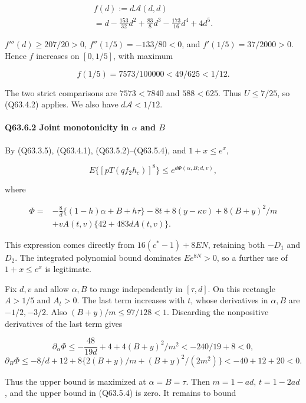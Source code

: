 \[
\begin{gathered}
f(d):=d\mathcal A(d,d)\\
=d-\frac{153}{32}d^2+\frac{83}{8}d^3-\frac{173}{16}d^4+4d^5.
\end{gathered}
\]

$f'''(d)\ge\allowbreak 207/20>\allowbreak 0$, $f''(1/5)=\allowbreak -133/80<\allowbreak 0$, and $f'(1/5)=\allowbreak 37/2000>\allowbreak 0$.
Hence $f$ increases on $[0,\allowbreak  1/5]$, with maximum

\[
f(1/5)=7573/100000<49/625<1/12.
\tag{Q63.6.2}\label{eq:Q63:Q63:6:2}
\]

The two strict comparisons are $7573<\allowbreak 7840$ and $588<\allowbreak 625$.
Thus $U\le\allowbreak 7/25$, so (Q63.4.2) applies. We also have $d\mathcal A<\allowbreak 1/12$.

\paragraph{Q63.6.2 Joint monotonicity in $\alpha$ and $B$}

By (Q63.3.5), (Q63.4.1), (Q63.5.2)--(Q63.5.4), and $1+x\le\allowbreak  e^x$,

\[
E\{[pT(qf_2h_c)]^8\}\le e^{d\Phi(\alpha,B;d,v)},
\]

where

\[
\begin{aligned}
\Phi={}&-\frac8d\{(1-h)\alpha+B+h\tau\}-8t
+8(y-\kappa v)+8(B+y)^2/m\\
&+v A(t,v)\{42+483dA(t,v)\}.
\end{aligned}
\tag{Q63.6.3}\label{eq:Q63:Q63:6:3}
\]

This expression comes directly from $16(c^*-1)+8EN$, retaining both $-D_1$ and $D_2$.
The integrated polynomial bound dominates $Ee^{8N}>\allowbreak 0$, so a further use of $1+x\le\allowbreak  e^x$ is legitimate.

Fix $d,\allowbreak  v$ and allow $\alpha,\allowbreak  B$ to range independently in $[\tau,\allowbreak  d]$. On this rectangle $A>\allowbreak 1/5$ and $A_t>\allowbreak 0$.
The last term increases with $t$, whose derivatives in $\alpha,\allowbreak  B$ are $-1/2,\allowbreak -3/2$.
Also $(B+y)/m\le\allowbreak 97/128<\allowbreak 1$. Discarding the nonpositive derivatives of the last term gives

\[
\partial_\alpha\Phi\le-\frac{48}{19d}+4+4(B+y)^2/m^2
<-240/19+8<0,
\]
\[
\partial_B\Phi\le-8/d+12+8\{2(B+y)/m+(B+y)^2/(2m^2)\}
<-40+12+20<0.
\]

Thus the upper bound is maximized at $\alpha=\allowbreak B=\allowbreak \tau$.
Then $m=\allowbreak 1-ad$, $t=\allowbreak 1-2ad$, and the upper bound in (Q63.5.4) is zero. It remains to bound

